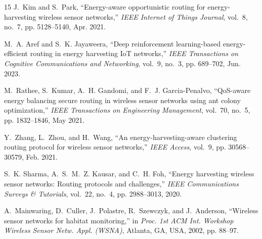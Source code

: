 \documentclass[journal]{IEEEtran}
\begin{document}
\begin{thebibliography}{15}
J.~Kim and S.~Park, ``Energy-aware opportunistic routing for energy-harvesting wireless sensor networks,'' \textit{IEEE Internet of Things Journal}, vol.~8, no.~7, pp. 5128--5140, Apr. 2021.

M.~A. Aref and S.~K. Jayaweera, ``Deep reinforcement learning-based energy-efficient routing in energy harvesting IoT networks,'' \textit{IEEE Transactions on Cognitive Communications and Networking}, vol.~9, no.~3, pp. 689--702, Jun. 2023.

M.~Rathee, S.~Kumar, A.~H. Gandomi, and F.~J. Garcia-Penalvo, ``QoS-aware energy balancing secure routing in wireless sensor networks using ant colony optimization,'' \textit{IEEE Transactions on Engineering Management}, vol.~70, no.~5, pp. 1832--1846, May 2021.

Y.~Zhang, L.~Zhou, and H.~Wang, ``An energy-harvesting-aware clustering routing protocol for wireless sensor networks,'' \textit{IEEE Access}, vol.~9, pp. 30568--30579, Feb. 2021.

S.~K. Sharma, A.~S.~M.~Z. Kausar, and C.~H. Foh, ``Energy harvesting wireless sensor networks: Routing protocols and challenges,'' \textit{IEEE Communications Surveys \& Tutorials}, vol.~22, no.~4, pp. 2988--3013, 2020.

A.~Mainwaring, D.~Culler, J.~Polastre, R.~Szewczyk, and J.~Anderson, ``Wireless sensor networks for habitat monitoring,'' in \textit{Proc. 1st ACM Int. Workshop Wireless Sensor Netw. Appl. (WSNA)}, Atlanta, GA, USA, 2002, pp. 88--97.

\end{thebibliography}
\end{document}
